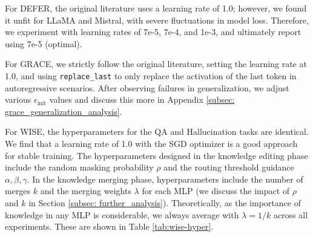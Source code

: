 \documentclass{article}
\begin{document}
\begin{table}
  \centering
  \vspace{-0.4cm}
  \caption{WISE hyper-parameters during editing and merging.}
  \vspace{5pt}
  \label{tab:wise-hyper}%
\end{table}
For DEFER, the original literature uses a learning rate of 1.0; however, we found it unfit for LLaMA and Mistral, with severe fluctuations in model loss.
Therefore, we experiment with learning rates of 7e-5, 7e-4, and 1e-3, and ultimately report using 7e-5 (optimal).

For GRACE, we strictly follow the original literature, setting the learning rate at 1.0, and using \texttt{replace\_last} to only replace the activation of the last token in autoregressive scenarios.
After observing failures in generalization, we adjust various $ \epsilon_{\text{init}} $ values and discuss this more in Appendix \ref{subsec: grace_generalization_analysis}.

For WISE, the hyperparameters for the QA and Hallucination tasks are identical.
We find that a learning rate of 1.0 with the SGD \cite{sgd} optimizer is a good approach for stable training.
The hyperparameters designed in the knowledge editing phase include the random masking probability $ \rho $ and the routing threshold guidance $ \alpha, \beta, \gamma $.
In the knowledge merging phase, hyperparameters include the number of merges $ k $ and the merging weights $ \lambda $ for each MLP (we discuss the impact of $ \rho $ and $ k $ in Section \ref{subsec: further_analysis}).
Theoretically, as the importance of knowledge in any MLP is considerable, we always average with $ \lambda = 1 / k $ across all experiments. These are shown in Table \ref{tab:wise-hyper}.
\end{document}
